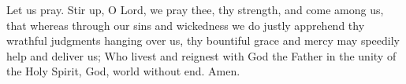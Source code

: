 \noindent Let us pray. Stir up, O Lord, we pray thee, thy strength, and come among us, that whereas through our sins and wickedness we do justly apprehend thy wrathful judgments hanging over us, thy bountiful grace and mercy may speedily help and deliver us; Who livest and reignest with God the Father in the unity of the Holy Spirit, God, world without end. Amen.